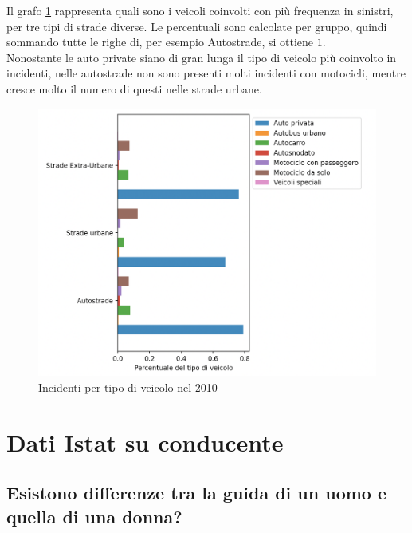 \documentclass[a4paper]{report}
\begin{document}
Il grafo \ref{fig:differenza-strade} rappresenta quali sono i veicoli coinvolti con più frequenza 
in sinistri, per tre tipi di strade diverse. Le percentuali sono calcolate per gruppo, quindi sommando 
tutte le righe di, per esempio Autostrade, si ottiene $1$.\\
Nonostante le auto private siano di gran lunga il tipo di veicolo 
più coinvolto in incidenti, nelle autostrade non sono presenti molti incidenti con motocicli, 
mentre cresce molto il numero di questi nelle strade urbane.

\begin{figure}
    \includegraphics[width=\linewidth]{../src/incidenti/incidenti_senza_coords/tipo_veicoli/differenza_strade.png}
    \caption{Incidenti per tipo di veicolo nel 2010}
    \label{fig:differenza-strade}
\end{figure}

\section{Dati Istat su conducente}

\subsection{Esistono differenze tra la guida di un uomo e quella di una donna?}
\end{document}
